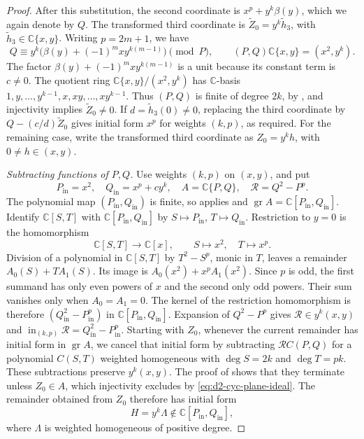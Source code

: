 \documentclass[11pt,letterpaper]{article}
\numberwithin{equation}{section}
\theoremstyle{remark}
\theoremstyle{plain}
\newcommand{\C}{\mathbb{C}}
\begin{document}
\begin{proof}
After this substitution, the second coordinate is $x^p+y^k\beta(y)$,
which we again denote by $Q$.
The transformed third coordinate is $\widetilde Z_0=y^k\widetilde h_3$,
with $\widetilde h_3\in\C\{x,y\}$.
Writing $p=2m+1$, we have
\begin{equation}
 Q\equiv y^k\bigl(\beta(y)+(-1)^mxy^{k(m-1)}\bigr)\pmod P,
 \qquad (P,Q)\C\{x,y\}=(x^2,y^k).
 \label{eq:d2-cyc-plane-ideal}
\end{equation}
The factor $\beta(y)+(-1)^mxy^{k(m-1)}$ is a unit
because its constant term is $c\neq0$.
The quotient ring $\C\{x,y\}/(x^2,y^k)$ has $\C$-basis
$1,y,\ldots,y^{k-1},x,xy,\ldots,xy^{k-1}$.  Thus $(P,Q)$ is finite of degree
$2k$, by , and injectivity implies
$\widetilde Z_0\neq0$.  If $d=\widetilde h_3(0)\neq0$, replacing the
third coordinate by $Q-(c/d)\widetilde Z_0$ gives initial form
$x^p$ for weights $(k,p)$, as required.
For the remaining case, write the transformed third coordinate as
$Z_0=y^kh$, with $0\neq h\in(x,y)$.

\smallskip
\noindent\emph{Subtracting functions of $P,Q$.}
Use weights $(k,p)$ on $(x,y)$, and put
\[
 P_{\mathrm{in}}=x^2,\quad Q_{\mathrm{in}}=x^p+cy^k,
 \quad A=\C\{P,Q\},\quad \mathcal R=Q^2-P^p.
\]
The polynomial map $(P_{\mathrm{in}},Q_{\mathrm{in}})$ is finite, so
 applies and
$\operatorname{gr}A=\C[P_{\mathrm{in}},Q_{\mathrm{in}}]$.
Identify $\C[S,T]$ with $\C[P_{\mathrm{in}},Q_{\mathrm{in}}]$ by
$S\mapsto P_{\mathrm{in}}$, $T\mapsto Q_{\mathrm{in}}$.
Restriction to $y=0$ is the homomorphism
\[
 \C[S,T]\longrightarrow\C[x],\qquad
 S\longmapsto x^2,\quad T\longmapsto x^p.
\]
Division of a polynomial in $\C[S,T]$ by $T^2-S^p$, monic in $T$,
leaves a remainder $A_0(S)+TA_1(S)$.  Its image is
$A_0(x^2)+x^pA_1(x^2)$.
Since $p$ is odd, the first summand has only even powers of $x$
and the second only odd powers.  Their sum vanishes only when
$A_0=A_1=0$.  The kernel of the restriction homomorphism is therefore
$(Q_{\mathrm{in}}^2-P_{\mathrm{in}}^p)$ in $\C[P_{\mathrm{in}},Q_{\mathrm{in}}]$.
Expansion of $Q^2-P^p$ gives $\mathcal R\in y^k(x,y)$ and
$\operatorname{in}_{(k,p)}\mathcal R=Q_{\mathrm{in}}^2-P_{\mathrm{in}}^p$.
Starting with $Z_0$, whenever the current remainder has initial form
in $\operatorname{gr}A$, we cancel that initial form by subtracting
$\mathcal R C(P,Q)$ for a polynomial $C(S,T)$ weighted homogeneous
with $\deg S=2k$ and $\deg T=pk$.
These subtractions preserve $y^k(x,y)$.
The proof of  shows that they terminate unless
$Z_0\in A$, which injectivity excludes by \eqref{eq:d2-cyc-plane-ideal}.
The remainder obtained from $Z_0$ therefore has initial form
\begin{equation}
 H=y^k\Lambda\notin\C[P_{\mathrm{in}},Q_{\mathrm{in}}],            \label{eq:d2-cyc-firstH}
\end{equation}
where $\Lambda$ is weighted homogeneous of positive degree.


\end{proof}
\end{document}
